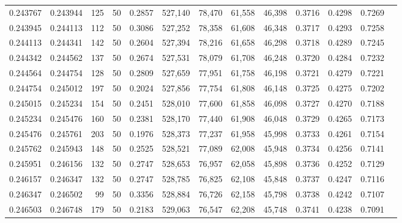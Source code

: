 \begin{tabular}{rrrrrrrrrrrrr}
0.243767 & 0.243944 &   125 &  50 &                                     0.2857 & 527,140 &  78,470 &  61,558 &  46,398 & 0.3716 & 0.4298 & 0.7269 \\
0.243945 & 0.244113 &   112 &  50 &                                     0.3086 & 527,252 &  78,358 &  61,608 &  46,348 & 0.3717 & 0.4293 & 0.7258 \\
0.244113 & 0.244341 &   142 &  50 &                                     0.2604 & 527,394 &  78,216 &  61,658 &  46,298 & 0.3718 & 0.4289 & 0.7245 \\
0.244342 & 0.244562 &   137 &  50 &                                     0.2674 & 527,531 &  78,079 &  61,708 &  46,248 & 0.3720 & 0.4284 & 0.7232 \\
0.244564 & 0.244754 &   128 &  50 &                                     0.2809 & 527,659 &  77,951 &  61,758 &  46,198 & 0.3721 & 0.4279 & 0.7221 \\
0.244754 & 0.245012 &   197 &  50 &                                     0.2024 & 527,856 &  77,754 &  61,808 &  46,148 & 0.3725 & 0.4275 & 0.7202 \\
0.245015 & 0.245234 &   154 &  50 &                                     0.2451 & 528,010 &  77,600 &  61,858 &  46,098 & 0.3727 & 0.4270 & 0.7188 \\
0.245234 & 0.245476 &   160 &  50 &                                     0.2381 & 528,170 &  77,440 &  61,908 &  46,048 & 0.3729 & 0.4265 & 0.7173 \\
0.245476 & 0.245761 &   203 &  50 &                                     0.1976 & 528,373 &  77,237 &  61,958 &  45,998 & 0.3733 & 0.4261 & 0.7154 \\
0.245762 & 0.245943 &   148 &  50 &                                     0.2525 & 528,521 &  77,089 &  62,008 &  45,948 & 0.3734 & 0.4256 & 0.7141 \\
0.245951 & 0.246156 &   132 &  50 &                                     0.2747 & 528,653 &  76,957 &  62,058 &  45,898 & 0.3736 & 0.4252 & 0.7129 \\
0.246157 & 0.246347 &   132 &  50 &                                     0.2747 & 528,785 &  76,825 &  62,108 &  45,848 & 0.3737 & 0.4247 & 0.7116 \\
0.246347 & 0.246502 &    99 &  50 &                                     0.3356 & 528,884 &  76,726 &  62,158 &  45,798 & 0.3738 & 0.4242 & 0.7107 \\
0.246503 & 0.246748 &   179 &  50 &                                     0.2183 & 529,063 &  76,547 &  62,208 &  45,748 & 0.3741 & 0.4238 & 0.7091 \\

\end{tabular}
